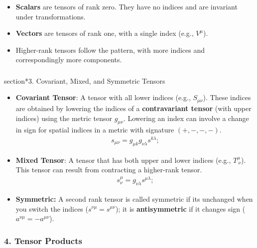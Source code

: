 \documentclass[11pt,letterpaper]{book}
\begin{document}
                \begin{itemize}
                    \item \textbf{Scalars} are tensors of rank zero. They have no indices and are invariant under transformations.
                    \item \textbf{Vectors} are tensors of rank one, with a single index (e.g., \( V^\mu \)).
                    \item Higher-rank tensors follow the pattern, with more indices and correspondingly more components.
                \end{itemize}
            
            \subsubsection{}section*{3. Covariant, Mixed, and Symmetric Tensors}
            
                \begin{itemize}
                    \item \textbf{Covariant Tensor}: A tensor with all lower indices (e.g., \( S_{\mu \nu} \)). These indices are obtained by lowering the indices of a \textbf{contravariant tensor} (with upper indices) using the metric tensor \( g_{\mu \nu} \). Lowering an index can involve a change in sign for spatial indices in a metric with signature \((+, -, -, -)\).
                    \begin{align}
                        s_{\mu \nu} = g_{\mu k} g_{\nu \lambda} s^{k \lambda};
                    \end{align}
                    \item \textbf{Mixed Tensor}: A tensor that has both upper and lower indices (e.g., \( T^{\mu}_{\ \nu} \)). This tensor can result from contracting a higher-rank tensor.
                    \begin{align}
                        s^{\mu}_{\nu} = g_{\nu \lambda} s^{\mu \lambda};
                    \end{align}
                    \item \textbf{Symmetric:} A second rank tensor is called symmetric if its unchanged when you switch the indices (\(s^{\nu \mu}=s^{\mu \nu}\)); it is \textbf{antisymmetric} if it changes sign (\(a^{\nu \mu}=-a^{\mu \nu}\)).
                \end{itemize}
            
            \subsubsection{4. Tensor Products}
            
\end{document}
